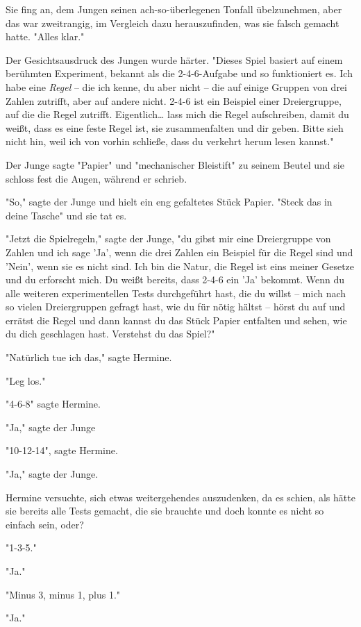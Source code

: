{Sie fing an, dem Jungen seinen ach-so-überlegenen Tonfall übelzunehmen, aber das war zweitrangig, im Vergleich dazu herauszufinden, was sie falsch gemacht hatte. "Alles klar."

Der Gesichtsausdruck des Jungen wurde härter. "Dieses Spiel basiert auf einem berühmten Experiment, bekannt als die 2-4-6-Aufgabe und so funktioniert es. Ich habe eine \emph{Regel} -- die ich kenne, du aber nicht -- die auf einige Gruppen von drei Zahlen zutrifft, aber auf andere nicht. 2-4-6 ist ein Beispiel einer Dreiergruppe, auf die die Regel zutrifft. Eigentlich… lass mich die Regel aufschreiben, damit du weißt, dass es eine feste Regel ist, sie zusammenfalten und dir geben. Bitte sieh nicht hin, weil ich von vorhin schließe, dass du verkehrt herum lesen kannst."

Der Junge sagte "Papier" und "mechanischer Bleistift" zu seinem Beutel und sie schloss fest die Augen, während er schrieb.

"So," sagte der Junge und hielt ein eng gefaltetes Stück Papier. "Steck das in deine Tasche" und sie tat es.

"Jetzt die Spielregeln," sagte der Junge, "du gibst mir eine Dreiergruppe von Zahlen und ich sage 'Ja', wenn die drei Zahlen ein Beispiel für die Regel sind und 'Nein', wenn sie es nicht sind. Ich bin die Natur, die Regel ist eins meiner Gesetze und du erforscht mich. Du weißt bereits, dass 2-4-6 ein 'Ja' bekommt. Wenn du alle weiteren experimentellen Tests durchgeführt hast, die du willst -- mich nach so vielen Dreiergruppen gefragt hast, wie du für nötig hältst -- hörst du auf und errätst die Regel und dann kannst du das Stück Papier entfalten und sehen, wie du dich geschlagen hast. Verstehst du das Spiel?"

"Natürlich tue ich das," sagte Hermine.

"Leg los."

"4-6-8" sagte Hermine.

"Ja," sagte der Junge

"10-12-14", sagte Hermine.

"Ja," sagte der Junge.

Hermine versuchte, sich etwas weitergehendes auszudenken, da es schien, als hätte sie bereits alle Tests gemacht, die sie brauchte und doch konnte es nicht so einfach sein, oder?

"1-3-5."

"Ja."

"Minus 3, minus 1, plus 1."

"Ja."

}
